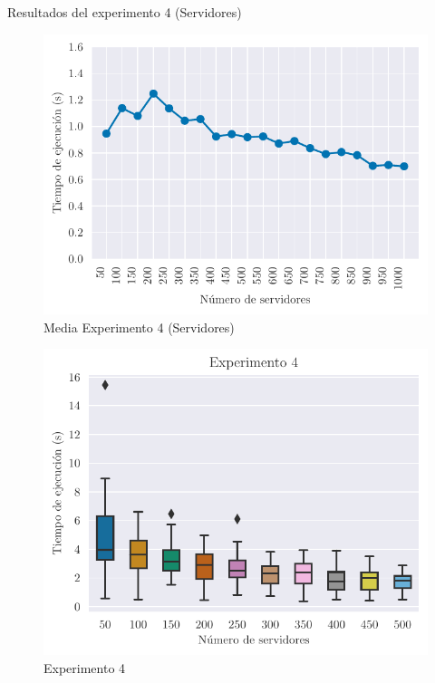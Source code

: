 \begin{table}[H]
    \caption{Resultados del experimento 4 (Servidores)}%
    \label{tab:ex4s}
    \begin{center}
    
    \end{center}
\end{table}

\begin{figure}[H]
    \centering
    \includegraphics{include/plots/ex4_s_mean_time.pdf}
    \caption{Media Experimento 4 (Servidores)}%
    \label{fig:ex4s_mean}
\end{figure}

\begin{figure}[H]
    \centering
    \includegraphics{include/plots/ex4_s_time_bplot_cut.pdf}
    \caption{Experimento 4}%
    \label{fig:ex4s}
\end{figure}

